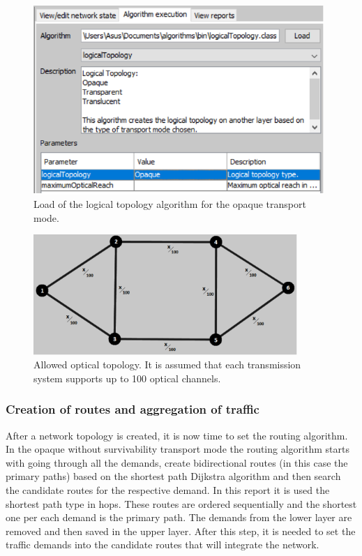 \begin{figure}[H]
\centering
\includegraphics[width=11cm]{sdf/heuristic/opaque/figures/logical_topology_load_opaque}
\caption{Load of the logical topology algorithm for the opaque transport mode.}
\label{logical_topology_load_opaque_surv}
\end{figure}

\begin{figure}[H]
\centering
\includegraphics[width=10cm]{sdf/heuristic/opaque/figures/allowed_optical}
\caption{Allowed optical topology. It is assumed that each transmission system supports up to 100 optical channels.}
\label{allowed_optical_surv_opaque}
\end{figure}

\subsubsection{Creation of routes and aggregation of traffic}

\vspace{11pt}
After a network topology is created, it is now time to set the routing algorithm. In the opaque without survivability transport mode the routing algorithm starts with going through all the demands, create bidirectional routes (in this case the primary paths) based on the shortest path Dijkstra algorithm and then search the candidate routes for the respective demand. In this report it is used the shortest path type in hops. These routes are ordered sequentially and the shortest one per each demand is the primary path. The demands from the lower layer are removed and then saved in the upper layer. After this step, it is needed to set the traffic demands into the candidate routes that will integrate the network.

